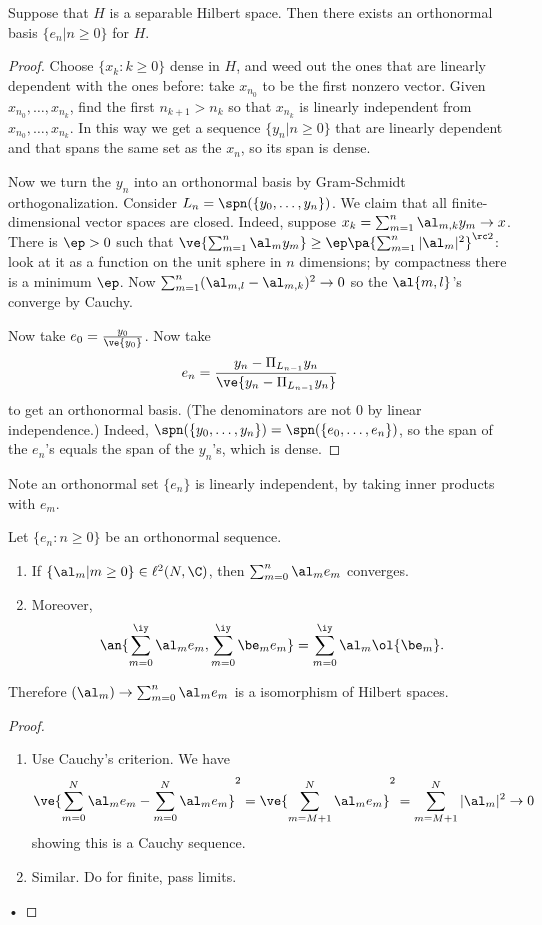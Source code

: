 \begin{lem}
Suppose that $H$ is a separable Hilbert space. Then there exists an orthonormal basis $\{e_n|n\ge 0\}$ for $H$.
\end{lem}
\begin{proof}
Choose $\{x_k:k\ge 0\}$ dense in $H$, and weed out the ones that are linearly dependent with the ones before: take $x_{n_0}$ to be the first nonzero vector. Given $x_{n_0},\ldots, x_{n_k}$, find the first $n_{k+1}>n_k$ so that $x_{n_k}$ is linearly independent from $x_{n_0},\ldots, x_{n_k}$. In this way we get a sequence $\{y_n|n\ge 0\}$ that are linearly dependent and that spans the same set as the $x_n$, so its span is dense.

Now we turn the $y_n$ into an orthonormal basis by Gram-Schmidt orthogonalization. Consider $L_n=\spn(\{y_0,\ldots, y_n\})$. We claim that all finite-dimensional vector spaces are closed. Indeed, suppose $x_k=\sum_{m=1}^n \al_{m,k}y_m\to x$. There is $\ep>0$ such that $\ve{\sum_{m=1}^n \al_my_m}\ge \ep\pa{\sum_{m=1}^n |\al_m|^2}^{\rc 2}$: 
look at it as a function on the unit sphere in $n$ dimensions; by compactness there is a minimum $\ep$. Now $\sum_{m=1}^n (\al_{m,l}-\al_{m,k})^2\to 0$ so the $\al{m,l}$'s converge by Cauchy.

Now take $e_0=\frac{y_0}{\ve{y_0}}$. Now take
\[
e_n=\frac{y_n-\Pi_{L_{n-1}}y_n}{\ve{y_n-\Pi_{L_{n-1}}y_n}}
\]
to get an orthonormal basis. (The denominators are not 0 by linear independence.) Indeed, $\spn(\{y_0,\ldots,y_n\})=\spn(\{e_0,\ldots, e_n\})$, so the span of the $e_n$'s equals the span of the $y_n$'s, which is dense.
\end{proof}
Note an orthonormal set $\{e_n\}$ is linearly independent, by taking inner products with $e_m$.
\begin{thm}
Let $\{e_n:n\ge 0\}$ be an orthonormal sequence.
\begin{enumerate}
\item
If $\{\al_m|m\ge 0\}\in \ell^2(N,\C)$, then $\sum_{m=0}^n \al_me_m$ converges.
\item
Moreover,
\[\an{
\sum_{m=0}^{\iy} \al_me_m,\sum_{m=0}^{\iy} \be_me_m
}=\sum_{m=0}^{\iy}\al_m\ol{\be_m}.
\]
\end{enumerate}
Therefore $(\al_m)\to \sum_{m=0}^n \al_me_m$ is a isomorphism of Hilbert spaces.
\end{thm}
\begin{proof}
\begin{enumerate}
\item
Use Cauchy's criterion. We have
\[
\ve{\sum_{m=0}^N\al_me_m-\sum_{m=0}^N \al_me_m}^2=
\ve{\sum_{m=M+1}^N \al_me_m}^2
=\sum_{m=M+1}^N |\al_m|^2\to 0
\]
showing this is a Cauchy sequence.
\item Similar. Do for finite, pass limits.
\end{enumerate}•
\end{proof}

